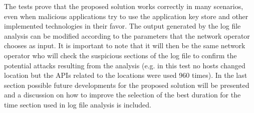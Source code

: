 \documentclass[a4paper,10pt]{memoir}
\begin{document}
{The tests prove that the proposed solution works correctly in many scenarios, even when malicious applications try to use the application key store and other implemented technologies in their favor. The output generated by the log file analysis can be modified according to the parameters that the network operator chooses as input. It is important to note that it will then be the same network operator who will check the suspicious sections of the log file to confirm the potential attacks resulting from the analysis (e.g. in this test no hosts changed location but the APIs related to the locations were used 960 times). In the last section possible future developments for the proposed solution will be presented and a discussion on how to improve the selection of the best duration for the time section used in log file analysis is included.

\clearpage

}
\end{document}
